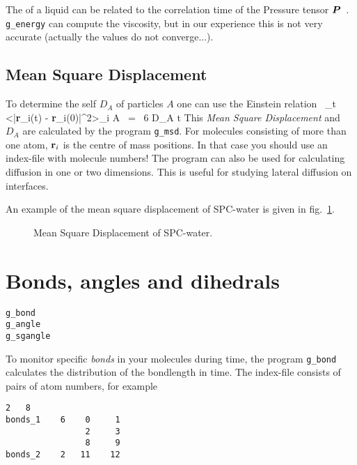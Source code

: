The  of a liquid can be related to the correlation 
time of the Pressure tensor $\mbox{\boldmath ${P}$}$~\cite{PSmith93c,Balasubramanian96}.
{\tt g\_energy} can compute the viscosity, but in our experience this is not very
accurate (actually the values do not converge...).

\subsection{Mean Square Displacement}
\label{sec:msd}
To determine the self  $D_A$ of particles $A$ one
can use the Einstein relation~\cite{Allen87} \beq \lim_{t \rightarrow
\infty} <|{\bf r}_i(t) - {\bf r}_i(0)|^2>_{i \in A} ~=~ 6 D_A t \eeq
This {\em Mean Square Displacement} and $D_A$ are calculated by the
program {\tt g\_msd}. For molecules consisting of more than one atom,
${\bf r}_i$ is the centre of mass positions. In that case you should
use an index-file with molecule numbers! The program can also be used
for calculating diffusion in one or two dimensions. This is useful for
studying lateral diffusion on interfaces. 

An example of the mean square displacement of SPC-water is given in
fig.~\ref{fig:msdwater}.
%
\begin{figure}
\centerline{
{}}
\caption{Mean Square Displacement of SPC-water.}
\label{fig:msdwater}
\end{figure}
%

% 
% 
\section{Bonds, angles and dihedrals}
\label{sec:bad}
\begin{verbatim}
g_bond
g_angle
g_sgangle
\end{verbatim}
To monitor specific {\em bonds} in your molecules during time, the program 
{\tt g\_bond} calculates the distribution of the bondlength in time. 
The index-file consists of pairs of atom numbers, for example
\begin{verbatim}
2   8
bonds_1    6    0     1
                2     3
                8     9
bonds_2    2   11    12
\end{verbatim}


